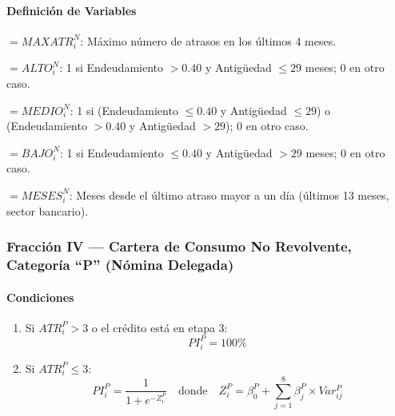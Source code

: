 \paragraph*{Definición de Variables}

\begin{description}[leftmargin=2.5cm, labelwidth=2.3cm]
    \item[$Var_{i1}^N$] $= MAXATR_i^N$: Máximo número de atrasos en los últimos 4 meses.
    \item[$Var_{i2}^N$] $= ALTO_i^N$: 1 si Endeudamiento $> 0.40$ y Antigüedad $\leq 29$ meses; 0 en otro caso.
    \item[$Var_{i3}^N$] $= MEDIO_i^N$: 1 si (Endeudamiento $\leq 0.40$ y Antigüedad $\leq 29$) o (Endeudamiento $> 0.40$ y Antigüedad $> 29$); 0 en otro caso.
    \item[$Var_{i4}^N$] $= BAJO_i^N$: 1 si Endeudamiento $\leq 0.40$ y Antigüedad $> 29$ meses; 0 en otro caso.
    \item[$Var_{i5}^N$] $= MESES_i^N$: Meses desde el último atraso mayor a un día (últimos 13 meses, sector bancario).
\end{description}

\subsubsection{Fracción IV --- Cartera de Consumo No Revolvente, Categoría ``P'' (Nómina Delegada)}

\paragraph*{Condiciones}

\begin{enumerate}[label=\alph*)]
    \item Si $ATR_i^P > 3$ o el crédito está en etapa 3:
        \begin{equation}
            PI_i^P = 100\%
        \end{equation}
    \item Si $ATR_i^P \leq 3$:
        \begin{equation}
            PI_i^P = \frac{1}{1 + e^{-Z_i^P}} \quad \text{donde} \quad Z_i^P = \beta_0^P + \sum_{j=1}^{8} \beta_j^P \times Var_{ij}^P
        \end{equation}
\end{enumerate}

